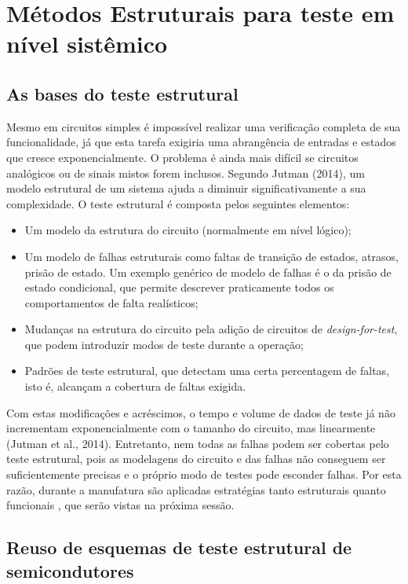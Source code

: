 \chapter*{Métodos Estruturais para teste em nível sistêmico}
\section{As bases do teste estrutural}

Mesmo em circuitos simples é impossível realizar uma verificação completa de sua funcionalidade, já que esta tarefa exigiria uma abrangência de entradas e estados que cresce exponencialmente. O problema é ainda mais difícil se circuitos analógicos ou de sinais mistos forem inclusos. Segundo Jutman (2014), um modelo estrutural de um sistema ajuda a diminuir significativamente a sua complexidade. O teste estrutural é composta pelos seguintes elementos:

\begin{itemize}
    \item Um modelo da estrutura do circuito (normalmente em nível lógico);
    \item Um modelo de falhas estruturais como faltas de transição de estados, atrasos, prisão de estado. Um exemplo genérico de modelo de falhas é o da prisão de estado condicional, que permite descrever praticamente todos os comportamentos de falta realísticos;
    \item Mudanças na estrutura do circuito pela adição de circuitos de \textit{design-for-test}, que podem introduzir modos de teste durante a operação;
    \item Padrões de teste estrutural, que detectam uma certa percentagem de faltas, isto é, alcançam a cobertura de faltas exigida.
\end{itemize}

Com estas modificações e acréscimos, o tempo e volume de dados de teste já não incrementam exponencialmente com o tamanho do circuito, mas linearmente (Jutman et al., 2014). Entretanto, nem todas as falhas podem ser cobertas pelo teste estrutural, pois as modelagens do circuito e das falhas não conseguem ser suficientemente precisas e o próprio modo de testes pode esconder falhas. Por esta razão, durante a manufatura são aplicadas estratégias tanto estruturais quanto funcionais \citep{zeng2004, maxwell2000comparing}, que serão vistas na próxima sessão.

\section{Reuso de esquemas de teste estrutural de semicondutores}

